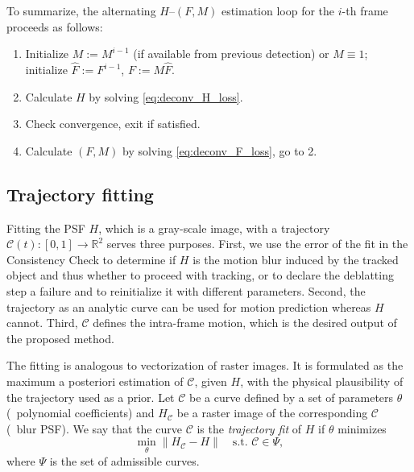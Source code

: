 \documentclass[10pt,twocolumn,letterpaper]{article}
\newcommand{\C}{\mathcal{C}}
\begin{document}
To summarize, the alternating $H$--$(F,M)$ estimation loop for the $i$-th frame proceeds as follows:
\vspace*{-0.5em}
\begin{enumerate}[leftmargin=*]
	\setlength\itemsep{-0.25em}
	\item Initialize $M:=M^{i-1}$ (if available from previous detection) or $M\equiv 1$; initialize $\hat F:=F^{i-1}$, $F:=M\hat F$.
	\item Calculate $H$ by solving \eqref{eq:deconv_H_loss}.
	\item Check convergence, exit if satisfied.
	\item Calculate $(F,M)$ by solving \eqref{eq:deconv_F_loss}, go to 2.
\end{enumerate}
 \subsection{Trajectory fitting}
\label{sec:fitting}


Fitting the PSF $H$, which is a gray-scale image, with a trajectory $\C(t): [0,1]\to\mathbb{R}^2$ serves three purposes. First, we use the error of the fit in the Consistency Check to determine if $H$
is the motion blur induced by the tracked object and thus whether to proceed with tracking,
or to declare the deblatting step a failure and 
to reinitialize it with different parameters. Second, the trajectory as an analytic curve can be used for motion prediction whereas $H$ cannot. Third, $\C$ defines the intra-frame motion, which is the desired output of the proposed method.



The fitting is analogous to vectorization of raster images. It is formulated as the maximum a posteriori estimation of $\C$, given $H$, with the physical plausibility of the trajectory used as a prior. Let $\mathcal{C}$ be a curve defined by a set of parameters $\theta$ (\eg~polynomial coefficients) and $H_{\C}$ be a raster image of the corresponding $\C$ (\ie~blur PSF). We say that the curve $\C$ is the \emph{trajectory fit} of $H$ if $\theta$ minimizes
\begin{equation}
	\label{eq:fitting_loss_H}
	\min_{\theta} \|H_\mathcal{C}-H\| \quad\text{s.t. }\mathcal{C}\in\Psi,
\end{equation}
where $\Psi$ is the set of admissible curves. 
\end{document}
